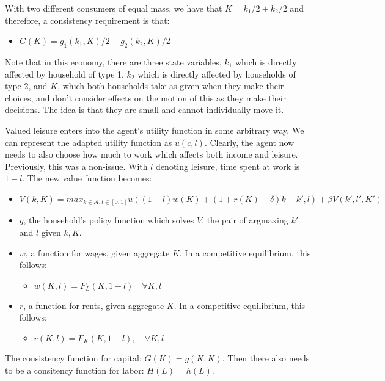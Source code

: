 \begin{questions}
\begin{solution}
With two different consumers of equal mass, we have that $K = k_1/2 + k_2/2$ and therefore, a consistency requirement is that:

\begin{itemize}
	\item $G(K) = g_1(k_1, K)/2 + g_2(k_2, K)/2$
\end{itemize}


Note that in this economy, there are three state variables, $k_1$ which is directly affected by household of type 1, $k_2$ which is directly affected by households of type 2, and $K$, which both households take as given when they make their choices, and don't consider effects on the motion of this as they make their decisions. The idea is that they are small and cannot individually move it.
\end{solution}

\begin{solution}
Valued leisure enters into the agent's utility function in some arbitrary way. We can represent the adapted utility function as $u\left(c, l\right)$. Clearly, the agent now needs to also choose how much to work which affects both income and leisure. Previously, this was a non-issue. With $l$ denoting leisure, time spent at work is $1-l$. The new value function becomes:

\begin{itemize}
	\item $V(k, K) = max_{k \in \mathcal{A}, l \in [0,1]} u\left( \left(1-l\right) w\left(K\right) + \left(1+r\left(K\right) - \delta \right) k - k', l\right) + \beta V\left(k', l', K'\right)$
	\item $g$, the household's policy function which solves $V$, the pair of argmaxing $k'$ and $l$ given $k, K$.
	\item $w$, a function for wages, given aggregate $K$. In a competitive equilibrium, this follows: 
	\begin{itemize}
		\item $w(K, l) = F_L\left( K, 1-l\right) \quad \forall K, l$
	\end{itemize}
\item $r$, a function for rents, given aggregate $K$. In a competitive equilibrium, this follows: 
	\begin{itemize}
		\item $r\left( K, l\right) = F_K\left(K, 1-l\right), \quad \forall K, l$
	\end{itemize}
\end{itemize}
The consistency function for capital: $G(K) = g(K, K)$. Then there also needs to be a consitency function for labor: $H(L) = h(L)$.
\end{solution}


\end{questions}
